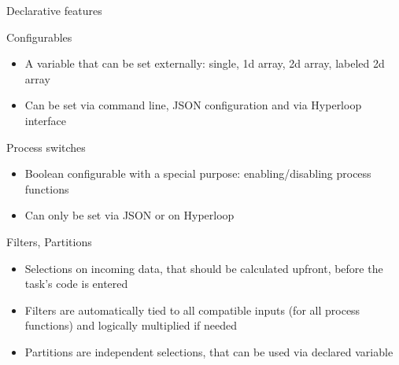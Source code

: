 \documentclass[10pt,lualatex,xcolor={table,svgnames},{hyperref={bookmarks=true,linktoc=all}},aspectratio=169]{beamer}
\newcommand{\programmatic}[1]{\textcolor{-green!40!yellow}{#1}}
\begin{document}
\begin{frame}{Declarative features}
    \begin{block}{Configurables}
        \begin{itemize}
            \item A variable that can be set externally: single, 1d array, 2d array, labeled 2d array
            \item Can be set via command line, JSON configuration and via Hyperloop interface
        \end{itemize}

    \end{block}
    \begin{block}{Process switches}
        \begin{itemize}
            \item Boolean configurable with a special purpose: enabling/disabling process functions
            \item Can only be set via JSON or on Hyperloop
        \end{itemize}

    \end{block}
    \begin{block}{Filters, Partitions}
        \begin{itemize}
            \item Selections on incoming data, that should be calculated upfront, before the task's code is entered
            \item \programmatic{Filters} are automatically tied to all compatible inputs (for all process functions) and logically multiplied if needed
            \item \programmatic{Partitions} are independent selections, that can be used via declared variable
        \end{itemize}

    \end{block}
\end{frame}
\end{document}

